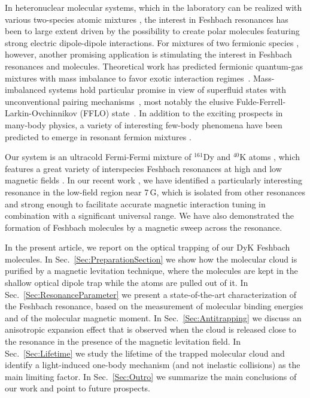 In heteronuclear molecular systems, which in the laboratory can be realized with various two-species atomic mixtures \cite{Ospelkaus2006uhm, Weber2008aou, Spiegelhalder2010aop, Wu2012uff, Heo2012fou, Koeppinger2014poo, Takekoshi2014uds, Wang2015fou, Lam2022hps}, the interest in Feshbach resonances has been to large extent driven by the possibility to create polar molecules featuring strong electric dipole-dipole interactions. For mixtures of two fermionic species \cite{Taglieber2008qdt, Wille2008eau, Voigt2009uhf, Naik2011fri, Hara2011qdm, Green2020fri, Ravensbergen2018poa, Ravensbergen2020rif, Ciamei2022ddf, Ciamei2022euc}, however, another promising application is stimulating the interest in Feshbach resonances and molecules. Theoretical work has predicted fermionic quantum-gas mixtures with mass imbalance to favor exotic interaction regimes~\cite{Gubbels2013ifg}. Mass-imbalanced systems hold particular promise in view of superfluid states with unconventional pairing mechanisms~\cite{Gubbels2009lpi, Wang2017eeo, Pini2021bmf}, most notably the elusive Fulde-Ferrell-Larkin-Ovchinnikov (FFLO) state~\cite{Fulde1964sia, Larkin1964nss, Radzihovsky2010ifr}. In addition to the exciting prospects in many-body physics, a variety of interesting few-body phenomena have been predicted to emerge in resonant fermion mixtures \cite{Naidon2017epa, Kartavtsev2007let}.

Our system is an ultracold Fermi-Fermi mixture of $^{161}$Dy and $^{40}$K atoms \cite{Ravensbergen2018poa}, which features a great variety of interspecies Feshbach resonances at high and low magnetic fields \cite{Ravensbergen2020rif, Ye2022ool}. In our recent work \cite{Ye2022ool}, we have identified a particularly interesting resonance in the low-field region near 7\,G, which is isolated from other resonances and strong enough to facilitate accurate magnetic interaction tuning in combination with a significant universal range. We have also demonstrated the formation of Feshbach molecules by a magnetic sweep across the resonance. 

In the present article, we report on the optical trapping of our DyK  Feshbach molecules. In Sec.~\ref{Sec:PreparationSection} we show how the molecular cloud is purified by a magnetic levitation technique, where the molecules are kept in the shallow optical dipole trap while the atoms are pulled out of it. In Sec.~\ref{Sec:ResonanceParameter} we present a state-of-the-art characterization of the Feshbach resonance, based on the measurement of molecular binding energies and of the molecular magnetic moment. In Sec.~\ref{Sec:Antitrapping} we discuss an anisotropic expansion effect that is observed when the cloud is released close to the resonance in the presence of the magnetic levitation field. In Sec.~\ref{Sec:Lifetime} we study the lifetime of the trapped molecular cloud and identify a light-induced one-body mechanism (and not inelastic collisions) as the main limiting factor. In Sec.~\ref{Sec:Outro} we summarize the main conclusions of our work and point to future prospects.



